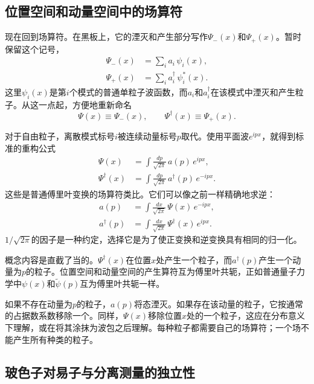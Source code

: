 \subsection{位置空间和动量空间中的场算符}

现在回到场算符。在黑板上，它的湮灭和产生部分写作\(\Psi_-(x)\)和\(\Psi_+(x)\)。暂时保留这个记号，
\begin{align}
\Psi_-(x) &= \sum_i a_i\,\psi_i(x),\\
\Psi_+(x) &= \sum_i a_i^\dagger\,\psi_i^*(x).
\end{align}
这里\(\psi_i(x)\)是第\(i\)个模式的普通单粒子波函数，而\(a_i\)和\(a_i^\dagger\)在该模式中湮灭和产生粒子。从这一点起，方便地重新命名
\[
\Psi(x)\equiv \Psi_-(x),
\qquad
\Psi^\dagger(x)\equiv \Psi_+(x).
\]

对于自由粒子，离散模式标号\(i\)被连续动量标号\(p\)取代。使用平面波\(e^{ipx}\)，就得到标准的重构公式
\begin{align}
\Psi(x) &= \int \frac{dp}{\sqrt{2\pi}}\,a(p)\,e^{ipx},\\
\Psi^\dagger(x) &= \int \frac{dp}{\sqrt{2\pi}}\,a^\dagger(p)\,e^{-ipx}.
\end{align}
这些是普通傅里叶变换的场算符类比。它们可以像之前一样精确地求逆：
\begin{align}
a(p) &= \int \frac{dx}{\sqrt{2\pi}}\,\Psi(x)\,e^{-ipx},\\
a^\dagger(p) &= \int \frac{dx}{\sqrt{2\pi}}\,\Psi^\dagger(x)\,e^{ipx}.
\end{align}
\(1/\sqrt{2\pi}\)的因子是一种约定，选择它是为了使正变换和逆变换具有相同的归一化。

概念内容是直截了当的。\(\Psi^\dagger(x)\)在位置\(x\)处产生一个粒子，而\(a^\dagger(p)\)产生一个动量为\(p\)的粒子。位置空间和动量空间的产生算符互为傅里叶共轭，正如普通量子力学中\(\psi(x)\)和\(\tilde{\psi}(p)\)互为傅里叶共轭一样。

如果不存在动量为\(p\)的粒子，\(a(p)\)将态湮灭。如果存在该动量的粒子，它按通常的占据数系数移除一个。同样，\(\Psi(x)\)移除位置\(x\)处的一个粒子，这应在分布意义下理解，或在将其涂抹为波包之后理解。每种粒子都需要自己的场算符；一个场不能产生所有种类的粒子。

\subsection{玻色子对易子与分离测量的独立性}

